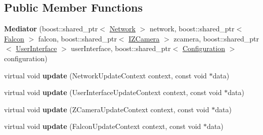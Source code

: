 \subsection*{Public Member Functions}
\begin{DoxyCompactItemize}
\item 
\hypertarget{classMediator_abbdd9e8fbf76b85a410aec8d47591876}{
{\bfseries Mediator} (boost::shared\_\-ptr$<$ \hyperlink{classNetwork}{Network} $>$ network, boost::shared\_\-ptr$<$ \hyperlink{classFalcon}{Falcon} $>$ falcon, boost::shared\_\-ptr$<$ \hyperlink{classIZCamera}{IZCamera} $>$ zcamera, boost::shared\_\-ptr$<$ \hyperlink{classUserInterface}{UserInterface} $>$ userInterface, boost::shared\_\-ptr$<$ \hyperlink{classConfiguration}{Configuration} $>$ configuration)}
\label{classMediator_abbdd9e8fbf76b85a410aec8d47591876}

\item 
\hypertarget{classMediator_ac85a7648a8c10a5b4db08412652d668b}{
virtual void {\bfseries update} (NetworkUpdateContext context, const void $\ast$data)}
\label{classMediator_ac85a7648a8c10a5b4db08412652d668b}

\item 
\hypertarget{classMediator_ae6aa511ce52b67c8e8da9a0810db0a87}{
virtual void {\bfseries update} (UserInterfaceUpdateContext context, const void $\ast$data)}
\label{classMediator_ae6aa511ce52b67c8e8da9a0810db0a87}

\item 
\hypertarget{classMediator_a86e3c5476aac2bc9858c80aef154a6f8}{
virtual void {\bfseries update} (ZCameraUpdateContext context, const void $\ast$data)}
\label{classMediator_a86e3c5476aac2bc9858c80aef154a6f8}

\item 
\hypertarget{classMediator_a62b886c8f9e0333f70db611947579a56}{
virtual void {\bfseries update} (FalconUpdateContext context, const void $\ast$data)}
\label{classMediator_a62b886c8f9e0333f70db611947579a56}


\end{DoxyCompactItemize}
